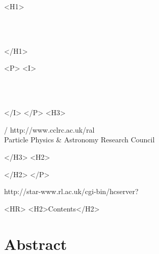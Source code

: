 \begin{htmlonly}
   \xlabel{}
   \begin{rawhtml} <H1> \end{rawhtml}
      \stardoctitle\\
      \stardocversion\\
      \stardocmanual
   \begin{rawhtml} </H1> \end{rawhtml}


   \begin{rawhtml} <P> <I> \end{rawhtml}
   \stardoccategory \stardocnumber \\
   \stardocauthors \\
   \stardocdate
   \begin{rawhtml} </I> </P> <H3> \end{rawhtml}
       /
                        {http://www.cclrc.ac.uk/ral} \\
      Particle Physics \& Astronomy Research Council \\
   \begin{rawhtml} </H3> <H2> \end{rawhtml}
   \begin{rawhtml} </H2> </P> \end{rawhtml}
      {http://star-www.rl.ac.uk/cgi-bin/hcserver?\stardocsource}\\

   \label{stardoccontents}
   \begin{rawhtml}
      <HR>
      <H2>Contents</H2>
   \end{rawhtml}

  \section{Abstract}

\end{htmlonly}

